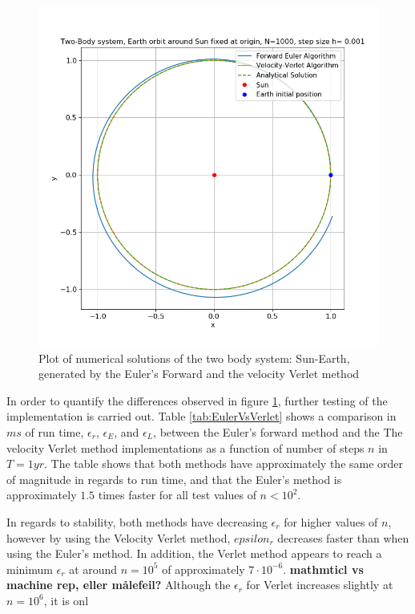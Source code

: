 \documentclass[%
oneside,                 %
final,                   %
10pt]{article}
\begin{document}
\begin{figure}[!htb]
        \centering 
         \includegraphics[scale=.6]{../Results/twoBodyNOOplot1.png} 
        \caption{Plot of numerical solutions of the two body system: Sun-Earth, generated by the Euler's Forward and the velocity Verlet method}
        \label{fig:twobodyplot}   
\end{figure}  

In order to quantify the differences observed in figure \ref{fig:twobodyplot}, further testing of the implementation is carried out. Table \ref{tab:EulerVsVerlet} shows a comparison in $ms$ of run time, $\epsilon_r$, $\epsilon_E$, and $\epsilon_L$, between the Euler's forward method and the The velocity Verlet method implementations as a function of number of steps $n$ in $T=1 yr$. The table shows that both methods have approximately the same order of magnitude in regards to run time, and that the Euler's method is approximately $1.5$ times faster for all test values of $n <10^2$. \newline

In regards to stability, both methods have decreasing $\epsilon_r$ for higher values of $n$,  however by using the Velocity Verlet method, $epsilon_r$ decreases faster than when using the Euler's method. In addition, the Verlet method appears to reach a minimum $\epsilon_r$ at around $n=10^5$ of approximately $7\cdot 10^{-6}$. \textbf{mathmticl vs machine rep, eller målefeil?} Although the $\epsilon_r$ for Verlet increases slightly at $n=10^6$, it is onl
\end{document}
